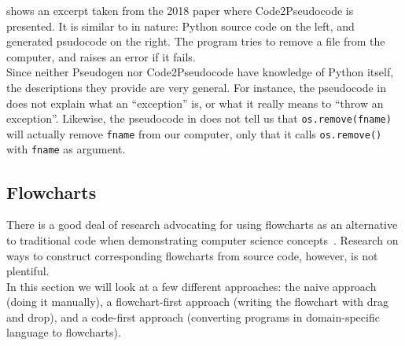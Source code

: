  shows an excerpt taken from the 2018 paper where Code2Pseudocode is presented. It is similar to  in nature: Python source code on the left, and generated psudocode on the right. The program tries to remove a file from the computer, and raises an error if it fails. \\

Since neither Pseudogen nor Code2Pseudocode have knowledge of Python itself, the descriptions they provide are very general. For instance, the pseudocode in  does not explain what an ``exception'' is, or what it really means to ``throw an exception''. Likewise, the pseudocode in  does not tell us that \texttt{os.remove(fname)} will actually remove \texttt{fname} from our computer, only that it calls \texttt{os.remove()} with \texttt{fname} as argument.



\subsection{Flowcharts}

There is a good deal of research advocating for using flowcharts as an alternative to traditional code when demonstrating computer science concepts~\cite{flowchartsAreGood1, flowchartsAreGood2, flowchartsAreGood3}. Research on ways to construct corresponding flowcharts from source code, however, is not plentiful. \\

In this section we will look at a few different approaches: the naive approach (doing it manually), a flowchart-first approach (writing the flowchart with drag and drop), and a code-first approach (converting programs in domain-specific language to flowcharts).

